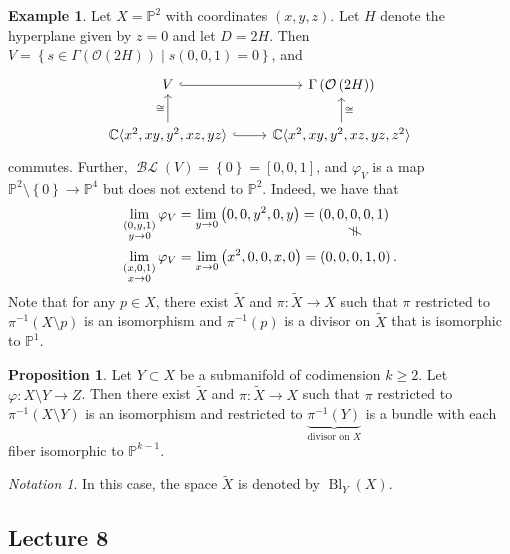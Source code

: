 \documentclass[10pt,letterpaper,cm]{nupset}
\theoremstyle{definition}
\newtheorem{exmp}[defn]{Example}
\theoremstyle{theorem}
\newtheorem{prop}[defn]{Proposition}
\theoremstyle{remark}
\newtheorem*{notation}{Notation}
\newcommand{\C}{\mathbb C}
\renewcommand{\O}{\mathcal O}
\renewcommand{\P}{\mathbb P}
\newcommand{\1}{\mathbb{1}}
\newcommand{\0}{\vec 0}
\DeclareMathOperator{\BL}{\mathcal{BL}}
\DeclareMathOperator{\bl}{\mathrm{Bl}}
\newcommand{\vertneq}{\rotatebox{90}{$\,\neq$}}
\newcommand{\net}[2]{\underset{\scriptstyle\overset{\mkern4mu\vertneq}{#2}}{#1}}
\begin{document}
\begin{exmp}
Let $X = \P^2$ with coordinates $\left(x,y,z\right)$. Let $H$ denote the hyperplane given by $z=0$ and let $D = 2{H}$. Then $ V= \left\{s\in \Gamma  \left(\O\left(2{H}\right)\right) \mid s\left(0,0,1\right) =0\right\}$, and
\[
\begin{tikzcd}
V \arrow[r, hook]                                                         & \Gamma\left(\O\left(2{H}\right)\right)                           \\
{\C\langle x^2, xy, y^2, xz,yz\rangle} \arrow[r, hook] \arrow[u, "\cong"] & {\C\langle x^2, xy, y^2, xz, yz, z^2\rangle} \arrow[u, "\cong"']
\end{tikzcd}
\] commutes. Further, $\BL(V) = \left\{0\right\} = \left[0,0,1\right]$, and $\varphi_V$ is a map $\P^2 \setminus \left\{0\right\} \to \P^4$ but does not extend to $\P^2$. Indeed, we have that
\begin{align*}
\lim_{\substack{\left(0, y, 1\right) \\ y\to 0}} \varphi_V  & = \lim_{y\to0}\left(0,0,y^2,0, y\right)= \net{\left(0,0,0,0,1\right)}{}
\\ \lim_{\substack{\left(x, 0, 1\right) \\ x\to 0}} \varphi_V  & = \lim_{x\to0}\left(x^2,0,0,x, 0\right)= \left(0,0,0,1,0\right).
\end{align*} Note that for any $p\in X$, there exist $\widetilde{X}$ and $\pi : \widetilde{X}\to X$ such that $\pi$ restricted to $\pi^{-1}\left(X\setminus p\right)$ is an isomorphism and $\pi^{-1}(p)$ is a divisor on $\widetilde{X}$ that is isomorphic to $\P^1$.
\end{exmp}

\begin{prop}
Let $Y \subset X$ be a submanifold of codimension $k\geq 2$. Let $\varphi : X \setminus Y \to Z$. Then there exist $\widetilde{X}$ and $\pi : \widetilde{X}\to X$ such that $\pi$ restricted to $\pi^{-1}\left(X\setminus Y\right)$ is an isomorphism and restricted to $\underbrace{\pi^{-1}(Y)}_{\text{divisor on }X}$ is a bundle with each fiber isomorphic to $\P^{k-1}$.
\end{prop}

\begin{notation}
In this case, the space $\widetilde{X}$ is denoted by $\bl_Y(X)$.
\end{notation}

\subsection{Lecture 8}
\end{document}
